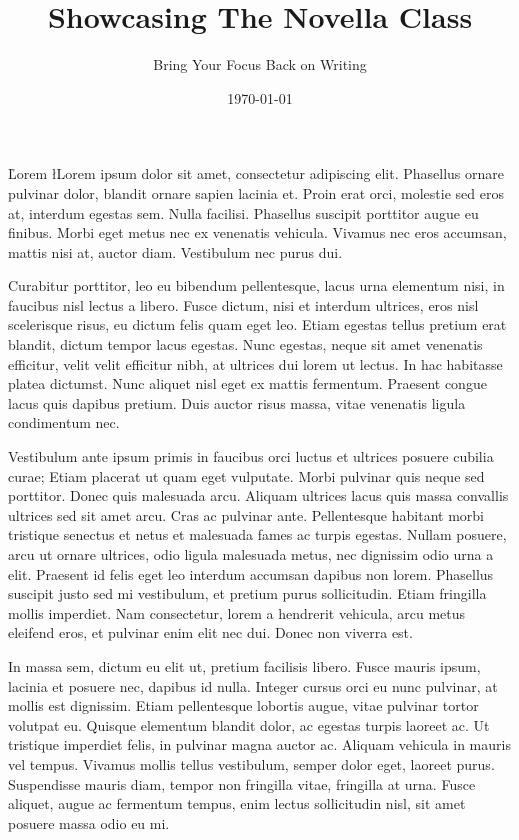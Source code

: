 \documentclass{news}
\title     {Showcasing The Novella Class}
\subtitle  {Bring Your Focus Back on Writing}
\date      {\today}
\begin{document}
{\Huge{}}
\begin{multicols}{4}
\h{Lorem}
\l{L}orem ipsum dolor sit amet, consectetur adipiscing elit. Phasellus ornare pulvinar dolor, blandit ornare sapien lacinia et. Proin erat orci, molestie sed eros at, interdum egestas sem. Nulla facilisi. Phasellus suscipit porttitor augue eu finibus. Morbi eget metus nec ex venenatis vehicula. Vivamus nec eros accumsan, mattis nisi at, auctor diam. Vestibulum nec purus dui.

Curabitur porttitor, leo eu bibendum pellentesque, lacus urna elementum nisi, in faucibus nisl lectus a libero. Fusce dictum, nisi et interdum ultrices, eros nisl scelerisque risus, eu dictum felis quam eget leo. Etiam egestas tellus pretium erat blandit, dictum tempor lacus egestas. Nunc egestas, neque sit amet venenatis efficitur, velit velit efficitur nibh, at ultrices dui lorem ut lectus. In hac habitasse platea dictumst. Nunc aliquet nisl eget ex mattis fermentum. Praesent congue lacus quis dapibus pretium. Duis auctor risus massa, vitae venenatis ligula condimentum nec.

Vestibulum ante ipsum primis in faucibus orci luctus et ultrices posuere cubilia curae; Etiam placerat ut quam eget vulputate. Morbi pulvinar quis neque sed porttitor. Donec quis malesuada arcu. Aliquam ultrices lacus quis massa convallis ultrices sed sit amet arcu. Cras ac pulvinar ante. Pellentesque habitant morbi tristique senectus et netus et malesuada fames ac turpis egestas. Nullam posuere, arcu ut ornare ultrices, odio ligula malesuada metus, nec dignissim odio urna a elit. Praesent id felis eget leo interdum accumsan dapibus non lorem. Phasellus suscipit justo sed mi vestibulum, et pretium purus sollicitudin. Etiam fringilla mollis imperdiet. Nam consectetur, lorem a hendrerit vehicula, arcu metus eleifend eros, et pulvinar enim elit nec dui. Donec non viverra est.

In massa sem, dictum eu elit ut, pretium facilisis libero. Fusce mauris ipsum, lacinia et posuere nec, dapibus id nulla. Integer cursus orci eu nunc pulvinar, at mollis est dignissim. Etiam pellentesque lobortis augue, vitae pulvinar tortor volutpat eu. Quisque elementum blandit dolor, ac egestas turpis laoreet ac. Ut tristique imperdiet felis, in pulvinar magna auctor ac. Aliquam vehicula in mauris vel tempus. Vivamus mollis tellus vestibulum, semper dolor eget, laoreet purus. Suspendisse mauris diam, tempor non fringilla vitae, fringilla at urna. Fusce aliquet, augue ac fermentum tempus, enim lectus sollicitudin nisl, sit amet posuere massa odio eu mi.


\end{multicols}
\end{document}
